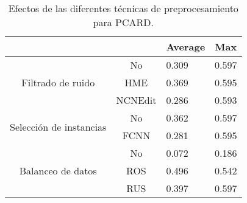 \begin{table}[]
    \begin{tabular}{cc|l|l|}
    \cline{3-4}
    \multicolumn{1}{l}{\textbf{}}          & \textbf{} & \multicolumn{1}{c|}{\textbf{Average}} & \textbf{Max} \\ \hline
    \multicolumn{1}{|c|}{\multirow{3}{*}{Filtrado de ruido}}       & No        & 0.309         & 0.597        \\ \cline{2-4} 
    \multicolumn{1}{|c|}{}                 & HME       & 0.369         & 0.595        \\ \cline{2-4} 
    \multicolumn{1}{|c|}{}                 & NCNEdit   & 0.286         & 0.593        \\ \hline
    \multicolumn{1}{|c|}{\multirow{2}{*}{Selección de instancias}} & No        & 0.362         & 0.597        \\ \cline{2-4} 
    \multicolumn{1}{|c|}{}                 & FCNN      & 0.281         & 0.595        \\ \hline
    \multicolumn{1}{|c|}{\multirow{3}{*}{Balanceo de datos}}       & No        & 0.072         & 0.186        \\ \cline{2-4} 
    \multicolumn{1}{|c|}{}                 & ROS       & 0.496         & 0.542        \\ \cline{2-4} 
    \multicolumn{1}{|c|}{}                 & RUS       & 0.397         & 0.597        \\ \hline
    \end{tabular}
    \caption{Efectos de las diferentes técnicas de preprocesamiento para PCARD.}
\end{table}